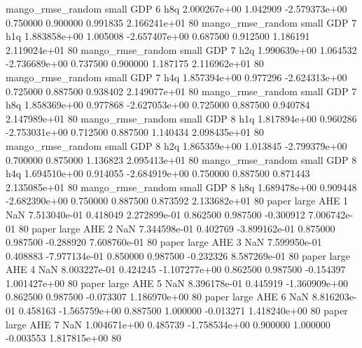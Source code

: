mango_rmse_random      small      GDP                 6                  h8q 2.000267e+00      1.042909 -2.579373e+00 0.750000 0.900000       0.991835 2.166241e+01 80
mango_rmse_random      small      GDP                 7                  h1q 1.883858e+00      1.005008 -2.657407e+00 0.687500 0.912500       1.186191 2.119024e+01 80
mango_rmse_random      small      GDP                 7                  h2q 1.990639e+00      1.064532 -2.736689e+00 0.737500 0.900000       1.187175 2.116962e+01 80
mango_rmse_random      small      GDP                 7                  h4q 1.857394e+00      0.977296 -2.624313e+00 0.725000 0.887500       0.938402 2.149077e+01 80
mango_rmse_random      small      GDP                 7                  h8q 1.858369e+00      0.977868 -2.627053e+00 0.725000 0.887500       0.940784 2.147989e+01 80
mango_rmse_random      small      GDP                 8                  h1q 1.817894e+00      0.960286 -2.753031e+00 0.712500 0.887500       1.140434 2.098435e+01 80
mango_rmse_random      small      GDP                 8                  h2q 1.865359e+00      1.013845 -2.799379e+00 0.700000 0.875000       1.136823 2.095413e+01 80
mango_rmse_random      small      GDP                 8                  h4q 1.694510e+00      0.914055 -2.684919e+00 0.750000 0.887500       0.871443 2.135085e+01 80
mango_rmse_random      small      GDP                 8                  h8q 1.689478e+00      0.909448 -2.682390e+00 0.750000 0.887500       0.873592 2.133682e+01 80
            paper      large      AHE                 1                  NaN 7.513040e-01      0.418049  2.272899e-01 0.862500 0.987500      -0.300912 7.006742e-01 80
            paper      large      AHE                 2                  NaN 7.344598e-01      0.402769 -3.899162e-01 0.875000 0.987500      -0.288920 7.608760e-01 80
            paper      large      AHE                 3                  NaN 7.599950e-01      0.408883 -7.977134e-01 0.850000 0.987500      -0.232326 8.587269e-01 80
            paper      large      AHE                 4                  NaN 8.003227e-01      0.424245 -1.107277e+00 0.862500 0.987500      -0.154397 1.001427e+00 80
            paper      large      AHE                 5                  NaN 8.396178e-01      0.445919 -1.360909e+00 0.862500 0.987500      -0.073307 1.186970e+00 80
            paper      large      AHE                 6                  NaN 8.816203e-01      0.458163 -1.565759e+00 0.887500 1.000000      -0.013271 1.418240e+00 80
            paper      large      AHE                 7                  NaN 1.004671e+00      0.485739 -1.758534e+00 0.900000 1.000000      -0.003553 1.817815e+00 80
